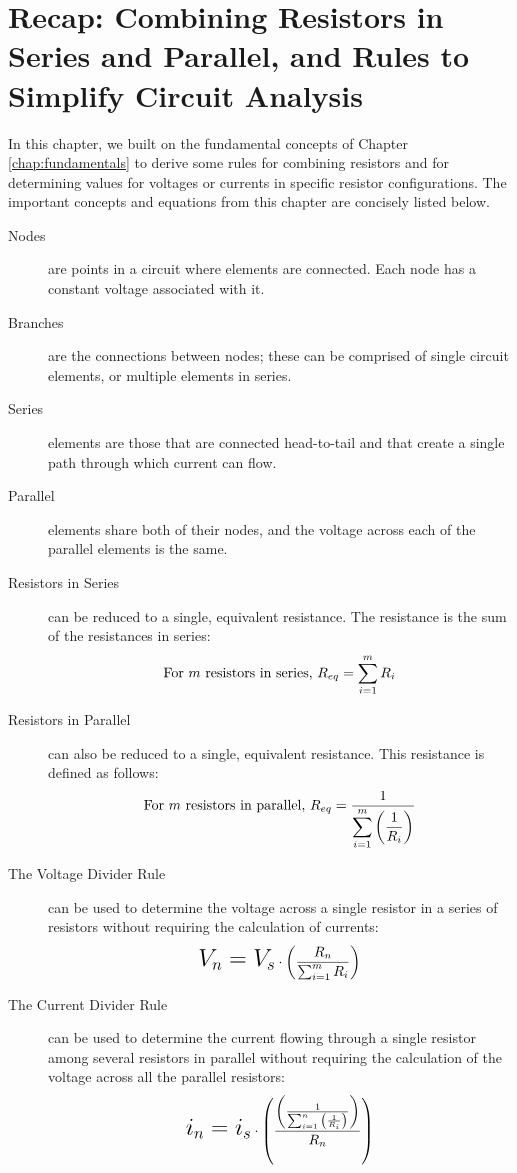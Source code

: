 \section{Recap: Combining Resistors in Series and Parallel, and Rules to Simplify Circuit Analysis}
In this chapter, we built on the fundamental concepts of Chapter \ref{chap:fundamentals} to derive some rules for combining resistors and for determining values for voltages or currents in specific resistor configurations. The important concepts and equations from this chapter are concisely listed below.
\begin{description}
\item[Nodes] are points in a circuit where elements are connected. Each node has a constant voltage associated with it.
\item[Branches] are the connections between nodes; these can be comprised of single circuit elements, or multiple elements in series.
\item[Series] elements are those that are connected head-to-tail and that create a single path through which current can flow.
\item[Parallel] elements share both of their nodes, and the voltage across each of the parallel elements is the same.
\item[Resistors in Series] can be reduced to a single, equivalent resistance. The resistance is the sum of the resistances in series: 
$$
\textnormal{For $m$ resistors in series,    }R_{eq} = \displaystyle\sum_{i=1}^{m}R_i
$$
\item[Resistors in Parallel] can also be reduced to a single, equivalent resistance. This resistance is defined as follows:
$$
\textnormal{For $m$ resistors in parallel,    }R_{eq} = \frac{1}{\displaystyle\sum_{i=1}^{m}\left(\frac{1}{R_i}\right)}
$$
\item[The Voltage Divider Rule] can be used to determine the voltage across a single resistor in a series of resistors without requiring the calculation of currents:$$\mathlarger{\mathlarger{\mathlarger{V_n = V_s}}} \cdot \left(\frac{R_n}{\sum_{i=1}^m{R_i}}\right)$$

\item[The Current Divider Rule] can be used to determine the current flowing through a single resistor among several resistors in parallel without requiring the calculation of the voltage across all the parallel resistors:
$$\mathlarger{\mathlarger{\mathlarger{i_n = i_s}}} \cdot \left(\frac{\left(\frac{1}{\sum_{i=1}^n{\left(\frac{1}{R_i}\right)}}\right)}{R_n}\right)$$
\end{description}

